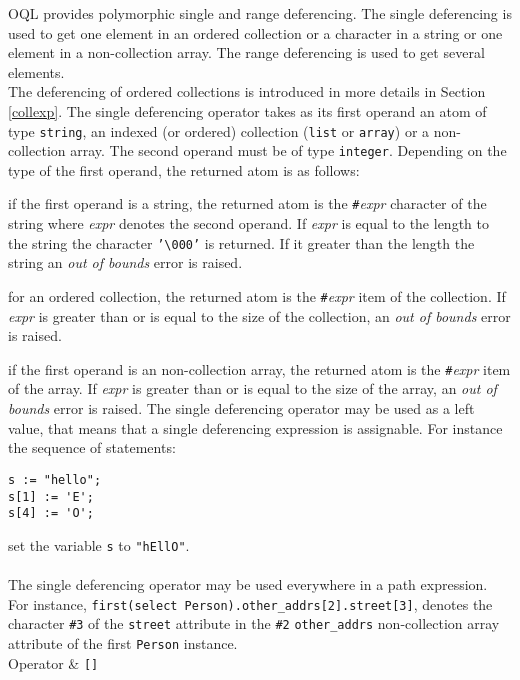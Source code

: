 \label{arraydef}
OQL provides polymorphic single and range deferencing. The single deferencing
is used to get one element in an ordered collection or a character in a string
or one element in a non-collection array. The range deferencing is used to
get several elements.\\
The deferencing of ordered collections is introduced in more details
in Section \ref{collexp}.
The single deferencing operator takes as its first operand an atom of type
\texttt{string}, an indexed 
(or ordered) collection (\texttt{list} or \texttt{array})
or a non-collection array. The second operand must be of type \texttt{integer}.
Depending on the type of the first operand, the returned atom
is as follows:
\be
\item if the first operand is a string,
the returned atom is the \texttt{\#}\emph{expr} character of the string
where \emph{expr} denotes the second operand.
If \emph{expr} is equal to the length to the string the character
\texttt{'{\textbackslash}000'} is returned. If it greater than the length the
string an \emph{out of bounds} error is raised.
\item for an ordered collection, the returned atom is the
\texttt{\#}\emph{expr} item of the collection. If \emph{expr} is greater
than or is equal to the size of the collection, an
\emph{out of bounds} error is raised.
\item if the first operand is an non-collection array, the returned atom is the
\texttt{\#}\emph{expr} item of the array. If \emph{expr} is greater
than or is equal to the size of the array, an
\emph{out of bounds} error is raised.
\ee
The single deferencing operator may be used as a left value, that means that a single
deferencing expression is assignable. For instance the sequence of
statements:
\verbsize
\begin{verbatim}
s := "hello";
s[1] := 'E';
s[4] := 'O';
\end{verbatim}
\normalsize
set the variable \texttt{s} to \texttt{"hEllO"}.
\\
\\
The single deferencing operator may be used everywhere in a path expression.
For instance, \texttt{first(select Person).other\_addrs[2].street[3]},
denotes the character \texttt{\#3} of the \texttt{street} attribute
in the \texttt{\#2} \texttt{other\_addrs} non-collection array attribute of
the first \texttt{Person} instance.
\geninfo\\
\hline Operator & \texttt{[]} \\
